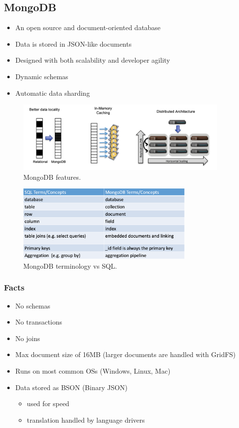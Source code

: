 \documentclass[10pt,a4paper]{article}
\begin{document}
\subsection{MongoDB}

\begin{itemize}
	\item An open source and document-oriented database
	\item Data is stored in JSON-like documents
	\item Designed with both scalability and developer agility
	\item Dynamic schemas
	\item Automatic data sharding
\end{itemize} 
 
\begin{figure}[ht!]
 \hfill \includegraphics[width=300pt]{images/mongodb-features.png}\hspace*{\fill}
  \caption{MongoDB features.}
  \end{figure}
  
\begin{figure}[ht!]
 \hfill \includegraphics[width=250pt]{images/mongodb-vs-sql.png}\hspace*{\fill}
  \caption{MongoDB terminology vs SQL.}
\end{figure}  
  
\subsubsection{Facts}
\begin{itemize}
	\item No schemas
	\item No transactions
	\item No joins
	\item Max document size of 16MB (larger documents are handled with GridFS)
	\item Runs on most common OSs (Windows, Linux, Mac)
	\item Data stored as BSON (Binary JSON)
	\begin{itemize}
		\item used for speed
		\item translation handled by language drivers
	\end{itemize}
\end{itemize}
 
\end{document}
